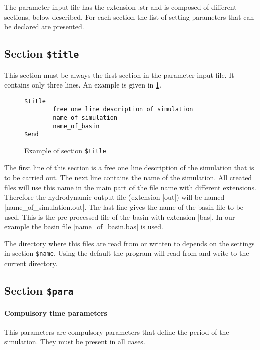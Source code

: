 The parameter input file has the extension .str and is composed of different sections, below described. For each section the list of setting parameters that can be declared are presented. 
\subsection{Section {\tt \$title}}
\label{parameter}

This section must be always the first section in the parameter input file.
It contains only three lines. An example is given in
\Fig\ref{fig:titleexample}.

\begin{figure}[hbtp]
\begin{verbatim}
$title
        free one line description of simulation
        name_of_simulation
        name_of_basin
$end
\end{verbatim}
\caption{Example of section {\tt \$title}}
\label{fig:titleexample}
\end{figure}

The first line of this section is a free one line description of
the simulation that is to be carried out. The next line contains
the name of the simulation.
All created files will use this name in the main part of the file name
with different extensions. Therefore the hydrodynamic output file
(extension |out|) will be named |name_of_simulation.out|.
The last line gives the name of the basin file to be used. This
is the pre-processed file of the basin with extension |bas|.
In our example the basin file |name_of_basin.bas| is used.

The directory where this files are read from or written to depends
on the settings in section {\tt \$name}. Using the default
the program will read from and write to the current directory.

\subsection{Section {\tt \$para}}
\paragraph{Compulsory time parameters}

This parameters are compulsory parameters that define the
period of the simulation. They must be present in all cases.

\par
{}
\par
{}
\par


